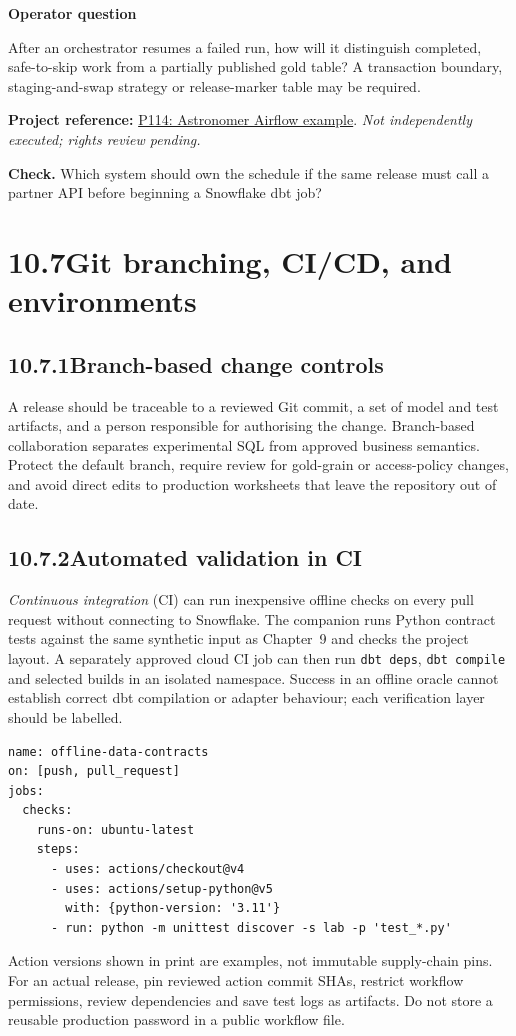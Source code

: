 \documentclass[11pt,twoside]{article}
\newcommand{\topic}[2]{\subsection*{#1\quad #2}}
\newcommand{\repo}[2]{\par\begingroup\fontsize{8.0}{9.6}\selectfont\sffamily\color{inkgray}\textbf{Project reference:} \href{#2}{#1}. \textit{Not independently executed; rights review pending.}\par\endgroup}
\begin{document}
\begin{whitebox}\textbf{Operator question}\par
After an orchestrator resumes a failed run, how will it distinguish completed, safe-to-skip work from a partially published gold table? A transaction boundary, staging-and-swap strategy or release-marker table may be required.\end{whitebox}
\repo{P114: Astronomer Airflow example}{https://github.com/astronomer/airflow-covid-data}
\textbf{Check.} Which system should own the schedule if the same release must call a partner API before beginning a Snowflake dbt job?
\newpage
\section*{10.7\quad Git branching, CI/CD, and environments}
\topic{10.7.1}{Branch-based change controls}
A release should be traceable to a reviewed Git commit, a set of model and test artifacts, and a person responsible for authorising the change. Branch-based collaboration separates experimental SQL from approved business semantics. Protect the default branch, require review for gold-grain or access-policy changes, and avoid direct edits to production worksheets that leave the repository out of date.
\topic{10.7.2}{Automated validation in CI}
\emph{Continuous integration} (CI) can run inexpensive offline checks on every pull request without connecting to Snowflake. The companion runs Python contract tests against the same synthetic input as Chapter~9 and checks the project layout. A separately approved cloud CI job can then run \texttt{dbt deps}, \texttt{dbt compile} and selected builds in an isolated namespace. Success in an offline oracle cannot establish correct dbt compilation or adapter behaviour; each verification layer should be labelled.
\begin{lstlisting}[caption={A safe pull-request workflow: no cloud secrets or billing.}]
name: offline-data-contracts
on: [push, pull_request]
jobs:
  checks:
    runs-on: ubuntu-latest
    steps:
      - uses: actions/checkout@v4
      - uses: actions/setup-python@v5
        with: {python-version: '3.11'}
      - run: python -m unittest discover -s lab -p 'test_*.py'
\end{lstlisting}
Action versions shown in print are examples, not immutable supply-chain pins. For an actual release, pin reviewed action commit SHAs, restrict workflow permissions, review dependencies and save test logs as artifacts. Do not store a reusable production password in a public workflow file.
\end{document}
